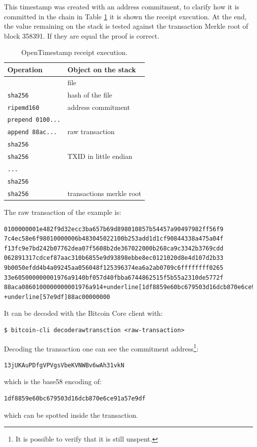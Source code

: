 This timestamp was created with an address commitment, to clarify how it is committed in the chain in Table \ref{tab:ots-ex} it is shown the receipt execution.
At the end, the value remaining on the stack is tested against the transaction Merkle root of block 358391. 
If they are equal the proof is correct.

\begin{table}
\begin{center}
\begin{tabular}{|p{3cm}|p{4cm}|}
	\hline
	\textbf{Operation} & \textbf{Object on the stack} \\ \hline
 & file \\ 
	\verb|sha256| & hash of the file \\ 
	\verb|ripemd160| & address commitment \\ 
	\verb|prepend 0100...| &  \\ 
	\verb|append 88ac...| & raw transaction \\ 
	\verb|sha256| &  \\ 
	\verb|sha256| & TXID in little endian \\ 
	\verb|...| &  \\ 
	\verb|sha256| &  \\ 
	\verb|sha256| & transactions merkle root \\ \hline
\end{tabular}
\end{center}
\caption[OpenTimestamp receipt execution.]{OpenTimestamp receipt execution.}
\label{tab:ots-ex}
\end{table}
The raw transaction of the example is:
\begin{Verbatim}[commandchars=+\[\], frame=single]
0100000001e482f9d32ecc3ba657b69d898010857b54457a90497982ff56f9
7c4ec58e6f98010000006b483045022100b253add1d1cf90844338a475a04f
f13fc9e7bd242b07762dea07f5608b2de367022000b268ca9c3342b3769cdd
062891317cdcef87aac310b6855e9d93898ebbe8ec0121020d8e4d107d2b33
9b0050efdd4b4a09245aa056048f125396374ea6a2ab0709c6ffffffff0265
33e605000000001976a9140bf057d40fbba6744862515f5b55a2310de5772f
88aca0860100000000001976a914+underline[1df8859e60bc679503d16dcb870e6ce91a]
+underline[57e9df]88ac00000000
\end{Verbatim}
It can be decoded with the Bitcoin Core client with:
\begin{verbatim}
$ bitcoin-cli decoderawtransction <raw-transaction>
\end{verbatim}
Decoding the transaction one can see the commitment address\footnote{It is possible to verify that it is still unspent.}:
\begin{verbatim}
13jUKAuPDfgVPVgsVbeKVNWBv6wAh31vkN
\end{verbatim}
which is the base58 encoding of:
\begin{verbatim}
1df8859e60bc679503d16dcb870e6ce91a57e9df
\end{verbatim}
which can be spotted inside the transaction.

